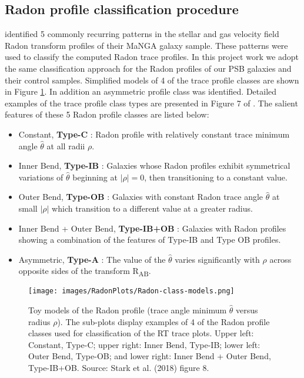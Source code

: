 \subsection{Radon profile classification procedure}
\label{sec:Radon-classification}

\cite{2018MNRAS.480.2217S} identified 5 commonly recurring patterns in the stellar and gas velocity field Radon transform profiles of their MaNGA galaxy sample. These patterns were used to classify the computed Radon trace profiles. In this project work we adopt the same classification approach for the Radon profiles of our PSB galaxies and their control samples. Simplified models of 4 of the trace profile classes are shown in Figure \ref{fig:class-models}. In addition an asymmetric profile class was identified. Detailed examples of the trace profile class types are presented in Figure 7 of \cite{2018MNRAS.480.2217S}. The salient features of these 5 Radon profile classes are listed below:

\begin{itemize}
    \item Constant, \textbf{Type-C} : Radon profile with relatively constant trace minimum angle $\hat{\theta}$ at all radii $\rho$.
    \item Inner Bend, \textbf{Type-IB} : Galaxies whose Radon profiles exhibit symmetrical variations of $\hat{\theta}$ beginning at $|\rho|=0$, then transitioning to a constant value. 
    \item Outer Bend, \textbf{Type-OB} : Galaxies with constant Radon trace angle $\hat{\theta}$  at small $|\rho|$ which transition to a different value at a greater radius. 
    \item Inner Bend + Outer Bend, \textbf{Type-IB+OB} : Galaxies with Radon profiles showing a combination of the features of Type-IB and Type OB profiles.
    \item Asymmetric, \textbf{Type-A} : The value of the $\hat{\theta}$ varies significantly with $\rho$ across opposite sides of the transform R\textsubscript{AB}. 
 \end{itemize}

\begin{figure}
    \centering
    \texttt{[image: images/RadonPlots/Radon-class-models.png]}
    \caption[Radon profile class feature identification: toy models]{Toy models of the Radon profile (trace angle minimum $\hat\theta$ versus radius $\rho$). The sub-plots display examples of 4 of the Radon profile classes used for classification of the RT trace plots. Upper left: Constant, Type-C; upper right: Inner Bend, Type-IB; lower left: Outer Bend, Type-OB; and lower right: Inner Bend + Outer Bend, Type-IB+OB. Source: Stark et al. (2018) figure 8.}
    \label{fig:class-models}
\end{figure}

